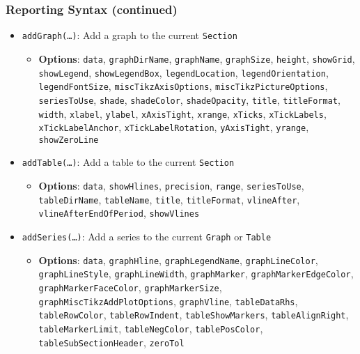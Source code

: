 \documentclass[10pt]{beamer}
\begin{document}
\begin{frame}
  \frametitle{Reporting Syntax (continued)}
  \begin{itemize}
  \item \texttt{addGraph(\ldots)}: Add a graph to the current \texttt{Section}
    \begin{itemize}
    \item \textbf{Options}: \texttt{data}, \texttt{graphDirName}, \texttt{graphName}, \texttt{graphSize}, \texttt{height}, \texttt{showGrid}, \texttt{showLegend}, \texttt{showLegendBox}, \texttt{legendLocation}, \texttt{legendOrientation}, \texttt{legendFontSize}, \texttt{miscTikzAxisOptions}, \texttt{miscTikzPictureOptions}, \texttt{seriesToUse}, \texttt{shade}, \texttt{shadeColor}, \texttt{shadeOpacity}, \texttt{title}, \texttt{titleFormat}, \texttt{width}, \texttt{xlabel}, \texttt{ylabel}, \texttt{xAxisTight}, \texttt{xrange}, \texttt{xTicks}, \texttt{xTickLabels}, \texttt{xTickLabelAnchor}, \texttt{xTickLabelRotation}, \texttt{yAxisTight}, \texttt{yrange}, \texttt{showZeroLine}
    \end{itemize}
  \item \texttt{addTable(\ldots)}: Add a table to the current \texttt{Section}
    \begin{itemize}
    \item \textbf{Options}: \texttt{data}, \texttt{showHlines}, \texttt{precision}, \texttt{range}, \texttt{seriesToUse}, \texttt{tableDirName}, \texttt{tableName}, \texttt{title}, \texttt{titleFormat}, \texttt{vlineAfter}, \texttt{vlineAfterEndOfPeriod}, \texttt{showVlines}
    \end{itemize}
  \item \texttt{addSeries(\ldots)}: Add a series to the current \texttt{Graph} or \texttt{Table}
    \begin{itemize}
    \item \textbf{Options}: \texttt{data}, \texttt{graphHline}, \texttt{graphLegendName}, \texttt{graphLineColor}, \texttt{graphLineStyle}, \texttt{graphLineWidth}, \texttt{graphMarker}, \texttt{graphMarkerEdgeColor}, \texttt{graphMarkerFaceColor}, \texttt{graphMarkerSize}, \texttt{graphMiscTikzAddPlotOptions}, \texttt{graphVline}, \texttt{tableDataRhs}, \texttt{tableRowColor}, \texttt{tableRowIndent}, \texttt{tableShowMarkers}, \texttt{tableAlignRight}, \texttt{tableMarkerLimit}, \texttt{tableNegColor}, \texttt{tablePosColor}, \texttt{tableSubSectionHeader}, \texttt{zeroTol}
    \end{itemize}
  \end{itemize}
\end{frame}
\end{document}
